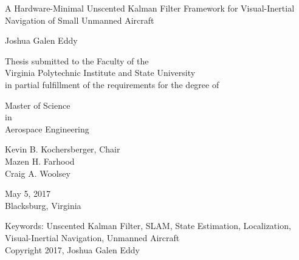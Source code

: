 \thispagestyle{empty}

\begin{center}
{\Large 
A Hardware-Minimal Unscented Kalman Filter Framework for Visual-Inertial Navigation of Small Unmanned Aircraft
}
\vfill

Joshua Galen Eddy

\vfill

Thesis submitted to the Faculty of the \\
Virginia Polytechnic Institute and State University \\
in partial fulfillment of the requirements for the degree of

\vfill

Master of Science \\
in \\
Aerospace Engineering

\vfill

Kevin B. Kochersberger, Chair \\
Mazen H. Farhood \\
Craig A. Woolsey

\vfill

May 5, 2017 \\
Blacksburg, Virginia

\vfill

Keywords: Unscented Kalman Filter, SLAM, State Estimation, Localization,\\
Visual-Inertial Navigation, Unmanned Aircraft
\\
Copyright 2017, Joshua Galen Eddy
\end{center}

\pagebreak
